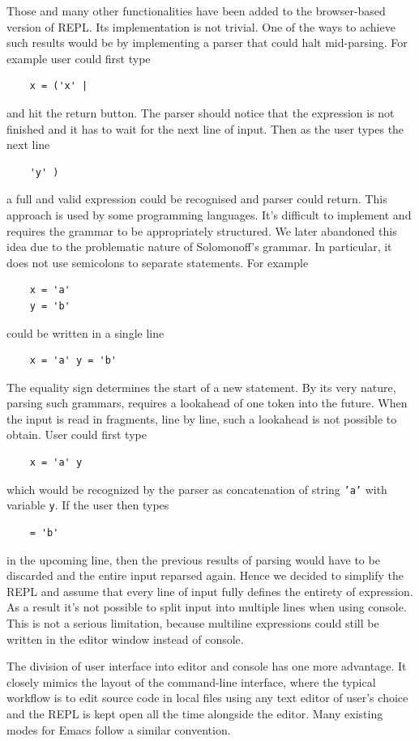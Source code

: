 Those and many other functionalities have been added to the browser-based version of REPL. Its implementation is not trivial. One of the ways to achieve such results would be by implementing a parser that could halt mid-parsing. For example user could first type
\begin{lstlisting}
	x = ('x' |
\end{lstlisting}
and hit the return button. The parser should notice that the expression is not finished and it has to wait for the next line of input.  Then as the user types the next line
\begin{lstlisting}
	'y' )
\end{lstlisting}
a full and valid expression could be recognised and parser could return.
This approach is used by some programming languages. It's difficult to implement and requires the grammar to be appropriately structured. We later abandoned this idea due to the problematic nature of Solomonoff's grammar. In particular, it does not use semicolons to separate statements. For example
\begin{lstlisting}
	x = 'a' 
	y = 'b'
\end{lstlisting}
could be written in a single line
\begin{lstlisting}
	x = 'a' y = 'b'
\end{lstlisting}
The equality sign determines the start of a new statement. By its very nature, parsing such grammars, requires a lookahead of one token into the future. When the input is read in fragments, line by line, such a lookahead is not possible to obtain.
User could first type
\begin{lstlisting}
	x = 'a' y
\end{lstlisting}
which would be recognized by the parser as concatenation of string    \texttt{'a'} with variable  \texttt{y}. If the user then types
\begin{lstlisting}
	= 'b'
\end{lstlisting}
in the upcoming line, then the previous results of parsing would have to be discarded and the entire input reparsed again. Hence we decided to simplify the REPL and assume that every line of input fully defines the entirety of expression. As a result it's not possible to split input into multiple lines when using console. This is not a serious limitation, because multiline expressions could still be written in the editor window instead of console. 

The division of user interface into editor and console has one more advantage. It closely mimics the layout of the command-line interface, where the typical workflow is to edit source code in local files using any text editor of user's choice and the REPL is kept open all the time alongside the editor. Many existing modes for Emacs follow a similar convention.

